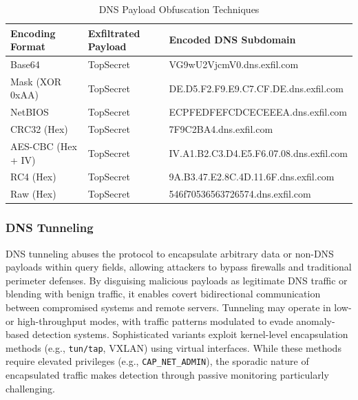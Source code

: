 \documentclass [11pt, proquest] {uwthesis}[2020/02/24]
\begin{document}
\begin{table}[h!]
\centering
\begin{tabular}{|l|l|l|}
\hline
\textbf{Encoding Format} & \textbf{Exfiltrated Payload} & \textbf{Encoded DNS Subdomain} \\
\hline
Base64 & TopSecret & VG9wU2VjcmV0.dns.exfil.com \\
\hline
Mask (XOR 0xAA) & TopSecret & DE.D5.F2.F9.E9.C7.CF.DE.dns.exfil.com \\
\hline
NetBIOS & TopSecret & ECPFEDFEFCDCECEEEA.dns.exfil.com \\
\hline
CRC32 (Hex) & TopSecret & 7F9C2BA4.dns.exfil.com \\
\hline
AES-CBC (Hex + IV) & TopSecret & IV.A1.B2.C3.D4.E5.F6.07.08.dns.exfil.com \\
\hline
RC4 (Hex) & TopSecret & 9A.B3.47.E2.8C.4D.11.6F.dns.exfil.com
\\
\hline
Raw (Hex) & TopSecret & 546f70536563726574.dns.exfil.com
\\
\hline
\end{tabular}
\caption{DNS Payload Obfuscation Techniques}
\label{dns_payload_obfuscation}
\end{table}

\subsubsection{DNS Tunneling}
DNS tunneling abuses the protocol to encapsulate arbitrary data or non-DNS payloads within query fields, allowing attackers to bypass firewalls and traditional perimeter defenses. By disguising malicious payloads as legitimate DNS traffic or blending with benign traffic, it enables covert bidirectional communication between compromised systems and remote servers. Tunneling may operate in low- or high-throughput modes, with traffic patterns modulated to evade anomaly-based detection systems.
Sophisticated variants exploit kernel-level encapsulation methods (e.g., \texttt{tun/tap}, VXLAN) using virtual interfaces. While these methods require elevated privileges (e.g., \texttt{CAP\_NET\_ADMIN}), the sporadic nature of encapsulated traffic makes detection through passive monitoring particularly challenging.
\end{document}
